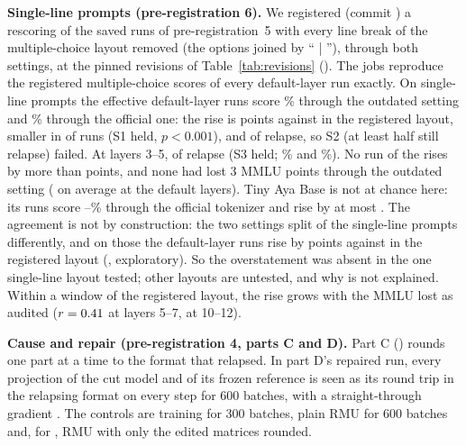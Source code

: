 \textbf{Single-line prompts (pre-registration 6).} We registered (commit \texttt{\revPrSixCommit}) a rescoring of the \slRuns{} saved runs of pre-registration~5 with every line break of the multiple-choice layout removed (the options joined by `` | ''), through both settings, at the pinned revisions of Table~\ref{tab:revisions} (). The jobs reproduce the registered multiple-choice scores of every default-layer run exactly. On single-line prompts the \slEffective{} effective default-layer runs score \slAudited\% through the outdated setting and \slDeployed\% through the official one: the rise is \slRise{} points against \slRiseRegistered{} in the registered layout, smaller in \slSmaller{} of \slPairs{} runs (S1 held, $p<0.001$), and \slRelapses{} of \slEffective{} relapse, so S2 (at least half still relapse) failed. At layers 3--5, \slShallowRel{} of \slShallowN{} relapse (S3 held; \slShallowAudited\% and \slShallowDeployed\%). No run of the \slAllRuns{} rises by more than \slMaxRise{} points, and none had lost 3 MMLU points through the outdated setting (\slMmluAudited{} on average at the default layers). Tiny Aya Base is not at chance here: its runs score \slBaseLow--\slBaseHigh\% through the official tokenizer and rise by at most \slBaseMaxRise{}. The agreement is not by construction: the two settings split \sltDiffer{} of the \sltTotal{} single-line \wmdp{} prompts differently, and on those the default-layer runs rise by \sltRise{} points against \sltRiseRegistered{} in the registered layout (, exploratory). So the overstatement was absent in the one single-line layout tested; other layouts are untested, and why is not explained. Within a window of the registered layout, the rise grows with the MMLU lost as audited ($r=0.41$ at layers 5--7, \dmgCorrDeep{} at 10--12).





\textbf{Cause and repair (pre-registration 4, parts C and D).} Part C () rounds one part at a time to the format that relapsed. In part D's repaired run, every projection of the cut model and of its frozen reference is seen as its round trip in the relapsing format on every step for 600 batches, with a straight-through gradient \citep{bengio2013estimating}. The controls are training for 300 batches, plain RMU for 600 batches and, for \fq{}, RMU with only the edited matrices rounded.



